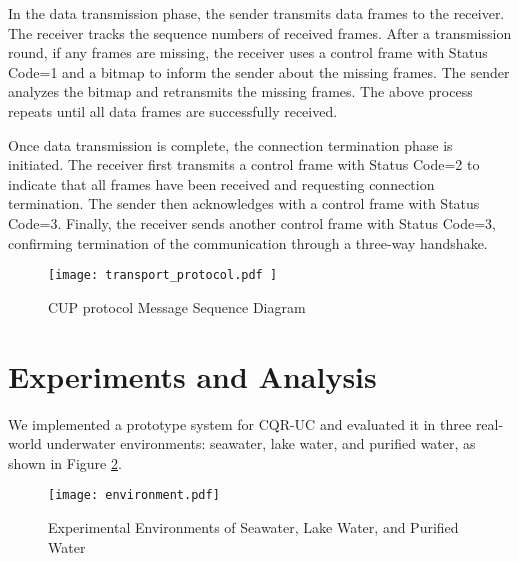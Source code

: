 \documentclass[preprint,12pt]{elsarticle}
\begin{document}
In the data transmission phase, the sender transmits data frames to the receiver. The receiver tracks the sequence numbers of received frames. After a transmission round, if any frames are missing, the receiver uses a control frame with Status Code=1 and a bitmap to inform the sender about the missing frames. The sender analyzes the bitmap and retransmits the missing frames. The above process repeats until all data frames are successfully received.

Once data transmission is complete, the connection termination phase is initiated.  The receiver first transmits a control frame with Status Code=2 to indicate that all frames have been received and requesting connection termination. The sender then acknowledges with a control frame with Status Code=3. Finally, the receiver sends another control frame with Status Code=3, confirming termination of the communication through a three-way handshake.


\begin{figure}[H]
\centering
    \texttt{[image: transport\_protocol.pdf
]}
    \caption{CUP protocol Message Sequence Diagram}
    \label{fig:transport_protocol}
\end{figure}

\section{Experiments and Analysis}

We implemented a prototype system for CQR-UC and evaluated it in three real-world underwater environments: seawater, lake water, and purified water, as shown in Figure \ref{fig:enter-label2}.

\begin{figure}[H]
\centering
    \texttt{[image: environment.pdf]}
    \caption{Experimental Environments of Seawater, Lake Water, and Purified Water}
    \label{fig:enter-label2}
\end{figure}
\end{document}
